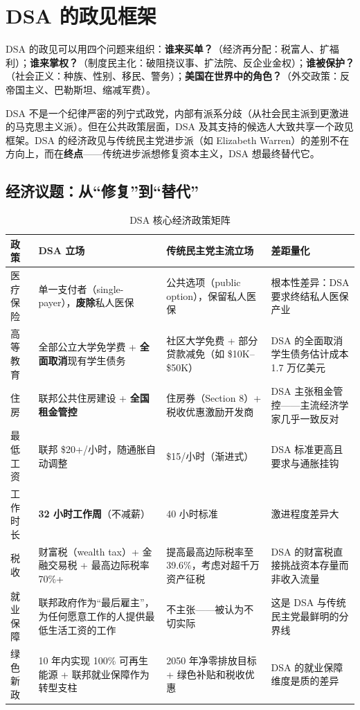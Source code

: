 \documentclass[12pt,a4paper]{ctexart}
\begin{document}
\section{DSA 的政见框架}

DSA 的政见可以用四个问题来组织：\textbf{谁来买单？}（经济再分配：税富人、扩福利）；\textbf{谁来掌权？}（制度民主化：破阻挠议事、扩法院、反企业金权）；\textbf{谁被保护？}（社会正义：种族、性别、移民、警务）；\textbf{美国在世界中的角色？}（外交政策：反帝国主义、巴勒斯坦、缩减军费）。

DSA 不是一个纪律严密的列宁式政党，内部有派系分歧（从社会民主派到更激进的马克思主义派）。但在公共政策层面，DSA 及其支持的候选人大致共享一个政见框架。DSA 的经济政见与传统民主党进步派（如 Elizabeth Warren）的差别不在方向上，而在\textbf{终点}——传统进步派想修复资本主义，DSA 想最终替代它。

\subsection{经济议题：从``修复''到``替代''}

\begin{table}[h]
\centering
\caption{DSA 核心经济政策矩阵}
\begin{tabular}{@{}lp{3.4cm}p{4.4cm}p{4.6cm}@{}}
\toprule
\textbf{政策} & \textbf{DSA 立场} & \textbf{传统民主党主流立场} & \textbf{差距量化} \\
\midrule
医疗保险 & 单一支付者（single-payer），\textbf{废除}私人医保 & 公共选项（public option），保留私人医保 & 根本性差异：DSA 要求终结私人医保产业 \\
高等教育 & 全部公立大学免学费 + \textbf{全面取消}现有学生债务 & 社区大学免费 + 部分贷款减免（如 \$10K--\$50K） & DSA 的全面取消学生债务估计成本 1.7 万亿美元 \\
住房 & 联邦公共住房建设 + \textbf{全国租金管控} & 住房券（Section 8）+ 税收优惠激励开发商 & DSA 主张租金管控——主流经济学家几乎一致反对 \\
最低工资 & 联邦 \$20+/小时，随通胀自动调整 & \$15/小时（渐进式） & DSA 标准更高且要求与通胀挂钩 \\
工作时长 & \textbf{32 小时工作周}（不减薪） & 40 小时标准 & 激进程度差异大 \\
税收 & 财富税（wealth tax）+ 金融交易税 + 最高边际税率 70\%+ & 提高最高边际税率至 39.6\%，考虑对超千万资产征税 & DSA 的财富税直接挑战资本存量而非收入流量 \\
就业保障 & 联邦政府作为``最后雇主''，为任何愿意工作的人提供最低生活工资的工作 & 不主张——被认为不切实际 & 这是 DSA 与传统民主党最鲜明的分界线 \\
绿色新政 & 10 年内实现 100\% 可再生能源 + 联邦就业保障作为转型支柱 & 2050 年净零排放目标 + 绿色补贴和税收优惠 & DSA 的就业保障维度是质的差异 \\
\bottomrule
\end{tabular}
\end{table}
\end{document}
